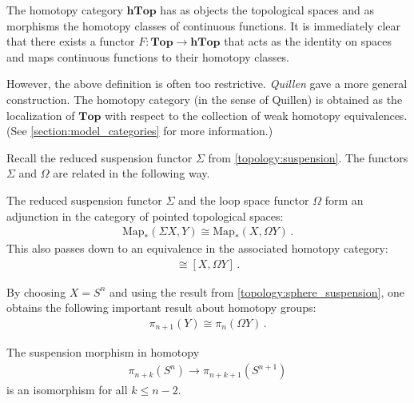     \begin{property}
        The homotopy category $\mathbf{hTop}$ has as objects the topological spaces and as morphisms the homotopy classes of continuous functions. It is immediately clear that there exists a functor $F:\mathbf{Top}\rightarrow\mathbf{hTop}$ that acts as the identity on spaces and maps continuous functions to their homotopy classes.

        However, the above definition is often too restrictive. \textit{Quillen} gave a more general construction. The homotopy category (in the sense of Quillen) is obtained as the localization of $\mathbf{Top}$ with respect to the collection of weak homotopy equivalences. (See \cref{section:model_categories} for more information.)
    \end{property}

    Recall the reduced suspension functor $\Sigma$ from \cref{topology:suspension}. The functors $\Sigma$ and $\Omega$ are related in the following way.
    \begin{property}\label{topology:eckmann_hilton}
        The reduced suspension functor $\Sigma$ and the loop space functor $\Omega$ form an adjunction in the category of pointed topological spaces:
        \begin{gather}
            \mathrm{Map}_*(\Sigma X,Y)\cong\mathrm{Map}_*(X,\Omega Y)\,.
        \end{gather}
        This also passes down to an equivalence in the associated homotopy category:
        \begin{gather}
            [\Sigma X,Y]\cong[X,\Omega Y]\,.
        \end{gather}
    \end{property}
    \begin{result}\label{topology:desuspension}
        By choosing $X=S^n$ and using the result from \cref{topology:sphere_suspension}, one obtains the following important result about homotopy groups:
        \begin{gather}
            \pi_{n+1}(Y)\cong\pi_n(\Omega Y)\,.
        \end{gather}
    \end{result}

    \begin{theorem}\label{topology:freudenthal}
        The suspension morphism in homotopy
        \begin{gather}
            \pi_{n+k}(S^n)\rightarrow\pi_{n+k+1}(S^{n+1})
        \end{gather}
        is an isomorphism for all $k\leq n-2$.
    \end{theorem}

